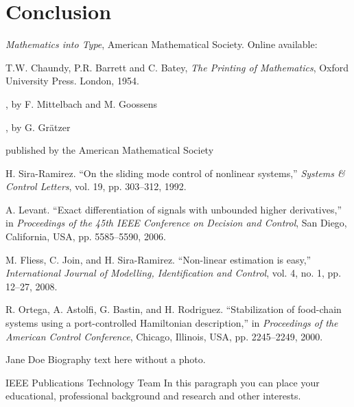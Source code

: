 \documentclass[lettersize,journal]{IEEEtran}
\begin{document}
\section{Conclusion}


\begin{thebibliography}{1}

{\it{Mathematics into Type}}, American Mathematical Society. Online available: 

T.W. Chaundy, P.R. Barrett and C. Batey, {\it{The Printing of Mathematics}}, Oxford University Press. London, 1954.

, by F. Mittelbach and M. Goossens

, by G. Gr\"atzer

 published by the American Mathematical Society

H. Sira-Ramirez. ``On the sliding mode control of nonlinear systems,'' \textit{Systems \& Control Letters}, vol. 19, pp. 303--312, 1992.

A. Levant. ``Exact differentiation of signals with unbounded higher derivatives,''  in \textit{Proceedings of the 45th IEEE Conference on Decision and Control}, San Diego, California, USA, pp. 5585--5590, 2006.

M. Fliess, C. Join, and H. Sira-Ramirez. ``Non-linear estimation is easy,'' \textit{International Journal of Modelling, Identification and Control}, vol. 4, no. 1, pp. 12--27, 2008.

R. Ortega, A. Astolfi, G. Bastin, and H. Rodriguez. ``Stabilization of food-chain systems using a port-controlled Hamiltonian description,'' in \textit{Proceedings of the American Control Conference}, Chicago, Illinois, USA, pp. 2245--2249, 2000.

\end{thebibliography}

\begin{IEEEbiographynophoto}{Jane Doe}
Biography text here without a photo.
\end{IEEEbiographynophoto}

\begin{IEEEbiography}{IEEE Publications Technology Team}
In this paragraph you can place your educational, professional background and research and other interests.\end{IEEEbiography}
\end{document}
